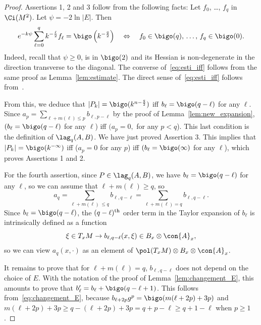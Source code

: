 \begin{proof}
Assertions 1, 2 and 3 follow from the following facts: Let $f_0$, \ldots, $f_q$ in $\Ci (M^2)$. Let $\psi = -2
\ln |E|$. Then
\begin{gather}\label{eq:esti_iff}
e^{-k \psi} \sum_{\ell =0}^q k^{-\frac{\ell}{2}} f_{\ell} = \bigo \left(k^{-\frac{q}{2}}\right) \quad \Leftrightarrow \quad f_0 \in \bigo (q),\, \ldots,\, f_q \in \bigo (0).
\end{gather}
Indeed, recall that $\psi \geqslant 0 $, is in $\bigo (2)$ and its Hessian is non-degenerate in the direction transverse to the diagonal. The converse of~\eqref{eq:esti_iff} follows from the same proof as Lemma~\ref{lem:estimate}. The direct sense of~\eqref{eq:esti_iff} follows from~\cite[Proposition~2.4 and Remark~2.5]{oim}.


From this, we deduce that $|P_k | = \bigo (k^{n -\frac{q}{2}})$ iff $b_{\ell} = \bigo (q-\ell)$ for any $\ell$. Since $a_{p} = \sum_{\ell + m (\ell) \leqslant p} b_{\ell, p -\ell}$ by the proof of Lemma~\ref{lem:new_expansion}, $(b_\ell = \bigo (q-\ell)$ for any $\ell$) iff $(a_p = 0,$ for any $p < q$). This last condition is the definition of $\lag _q (A,B)$. We have just proved Assertion 3. This implies that $|P_k | =\bigo (k^{-\infty})$ iff ($a_{p} = 0$ for any $p$) iff $(b_{\ell} = \bigo(
\infty)$ for any $\ell$), which proves Assertions 1 and 2.

For the fourth assertion, since $P \in \lag_q(A,B)$, we have $b_{\ell} = \bigo (q-\ell)$ for any $\ell$, so we can assume that $\ell + m (\ell) \geqslant q$, so
\[
a_q =
\sum_{\ell + m (\ell) \,\leqslant q } b_{\ell, q- \ell} =\sum_{\ell + m (\ell
) = q } b_{\ell, q- \ell}.
\]
Since $b_{\ell} = \bigo (q-\ell)$, the $(q-\ell)^{\rm th}$ order term in the Taylor expansion of $b_{\ell}$ is intrinsically defined as a function
\[
\xi \in T_xM \rightarrow b_{\ell, q- \ell}
(x,\xi) \in B_x \otimes \con{A}_x,
\]
so we can view $a_q(x,\cdot)$ as an element
of $\pol (T_xM) \otimes B_x \otimes \con{A}_x$.

It remains to prove that for $\ell + m (\ell) =q$, $b_{\ell, q-\ell}$ does not depend on the choice of $E$. With the notation of the proof of Lemma~\ref{lem:changement_E}, this amounts to prove that $b'_{\ell} = b_{\ell} +
\bigo (q-\ell +1)$. This follows from~\eqref{eq:changement_E}, because $b_{\ell + 2p } g^p = \bigo (m (\ell+ 2 p) +3 p)$ and $m(\ell +2p) + 3p \geqslant q - (\ell+ 2p) + 3p = q + p - \ell \geqslant q + 1 -\ell$ when $p
\geqslant 1$.
\end{proof}


